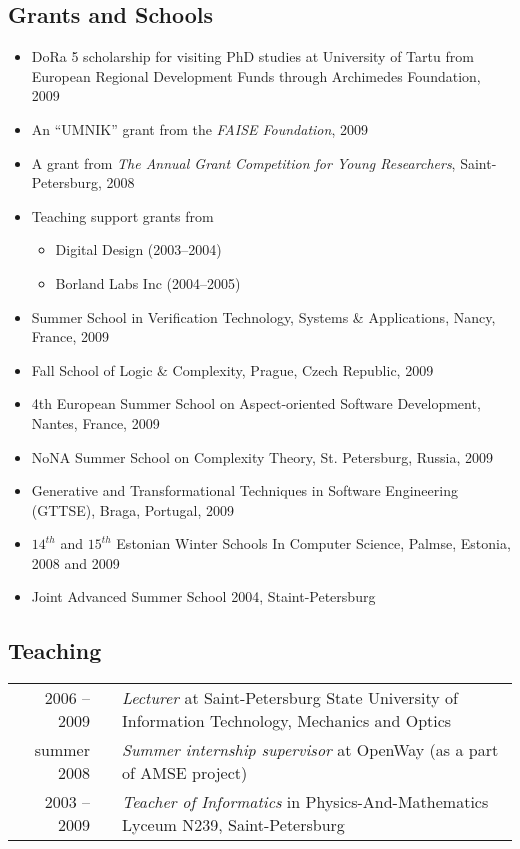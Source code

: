 \documentclass[a4paper, 12pt]{article}
\begin{document}
\subsection*{Grants and Schools}
\begin{itemize}
	\item DoRa 5 scholarship for visiting PhD studies at University of Tartu from European Regional Development Funds through Archimedes Foundation, 2009
	\item An ``UMNIK'' grant from the {\it FAISE Foundation}, 2009
	\item A grant from {\it The Annual Grant Competition for Young Researchers}, Saint-Petersburg, 2008
	\item {Teaching support grants from 
		\begin{itemize}
			\item Digital Design (2003--2004)  
			\item Borland Labs Inc (2004--2005) 
		\end{itemize}}
	\item Summer School in Verification Technology, Systems \& Applications, Nancy, France, 2009
	\item Fall School of Logic \& Complexity, Prague, Czech Republic, 2009
	\item 4th European Summer School on Aspect-oriented Software Development, Nantes, France, 2009
	\item NoNA Summer School on Complexity Theory, St. Petersburg, Russia, 2009
	\item Generative and Transformational Techniques in Software Engineering (GTTSE), Braga, Portugal, 2009
	\item $14^{th}$ and $15^{th}$ Estonian Winter Schools In Computer Science, Palmse, Estonia, 2008 and 2009
	\item Joint Advanced Summer School 2004, Staint-Petersburg
\end{itemize}

\subsection*{Teaching}
\begin{tabular}{ r l p{370pt} }
	2006 -- 2009 && {\it Lecturer} at Saint-Petersburg State University of Information Technology, Mechanics and Optics\\%
	summer 2008 && {\it Summer internship supervisor} at OpenWay (as a part of AMSE project)\\%
	2003 -- 2009 && {\it Teacher of Informatics} in Physics-And-Mathematics Lyceum N239, Saint-Petersburg\\%
\end{tabular}
\end{document}
